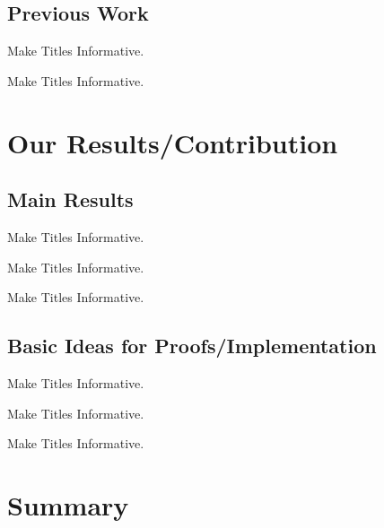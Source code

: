 \documentclass{beamer}
\begin{document}
\subsection{Previous Work}

\begin{frame}{Make Titles Informative.}
\end{frame}

\begin{frame}{Make Titles Informative.}
\end{frame}



\section{Our Results/Contribution}

\subsection{Main Results}

\begin{frame}{Make Titles Informative.}
\end{frame}

\begin{frame}{Make Titles Informative.}
\end{frame}

\begin{frame}{Make Titles Informative.}
\end{frame}


\subsection{Basic Ideas for Proofs/Implementation}

\begin{frame}{Make Titles Informative.}
\end{frame}

\begin{frame}{Make Titles Informative.}
\end{frame}

\begin{frame}{Make Titles Informative.}
\end{frame}



\section*{Summary}
\end{document}
